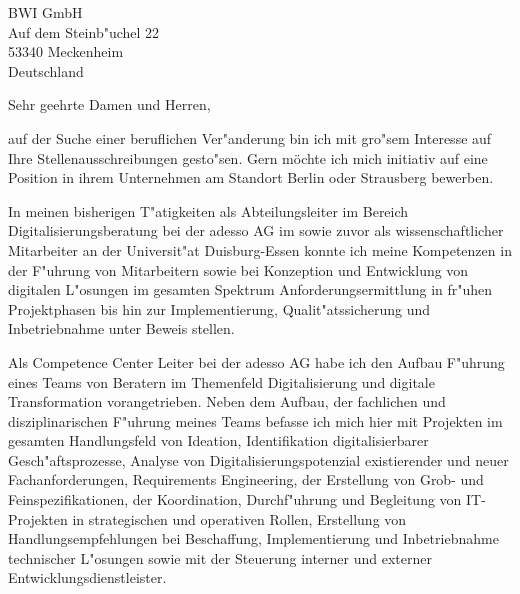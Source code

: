 \documentclass[10pt,a4paper]{dinbrief}
\date{\today}
\begin{document}
 
\begin{letter}  
{%
	BWI GmbH\\
	Auf dem Steinb"uchel 22\\
	53340 Meckenheim\\
	Deutschland
}
\subject{\bf Initiativbewerbung}
\opening{Sehr geehrte Damen und Herren,}
auf der Suche einer beruflichen Ver"anderung bin ich mit gro"sem Interesse auf Ihre Stellenausschreibungen gesto"sen. Gern möchte ich mich initiativ auf eine Position in ihrem Unternehmen am Standort Berlin oder Strausberg bewerben. 

In meinen bisherigen T"atigkeiten als Abteilungsleiter im Bereich Digitalisierungsberatung bei der adesso AG im sowie zuvor als wissenschaftlicher Mitarbeiter an der Universit"at Duisburg-Essen konnte ich meine Kompetenzen in der F"uhrung von Mitarbeitern sowie bei Konzeption und Entwicklung von digitalen L"osungen im gesamten Spektrum Anforderungsermittlung in fr"uhen Projektphasen bis hin zur Implementierung, Qualit"atssicherung und Inbetriebnahme unter Beweis stellen.


Als Competence Center Leiter bei der adesso AG habe ich den Aufbau F"uhrung eines Teams von Beratern im Themenfeld Digitalisierung und digitale Transformation vorangetrieben. Neben dem Aufbau, der fachlichen und disziplinarischen F"uhrung meines Teams befasse ich mich hier mit Projekten im gesamten Handlungsfeld von Ideation, Identifikation digitalisierbarer Gesch"aftsprozesse, Analyse von Digitalisierungspotenzial existierender und neuer Fachanforderungen, Requirements Engineering, der Erstellung von Grob- und Feinspezifikationen, der Koordination, Durchf"uhrung und Begleitung von IT-Projekten in strategischen und operativen Rollen, Erstellung von Handlungsempfehlungen bei Beschaffung, Implementierung und Inbetriebnahme technischer L"osungen sowie mit der Steuerung interner und externer Entwicklungsdienstleister. 


\end{letter}
\end{document}
